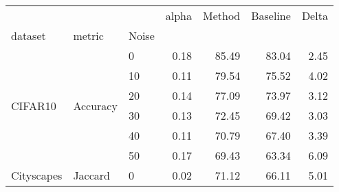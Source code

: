 \begin{tabular}{lllrrrr}
\toprule
 &  &  & alpha & Method & Baseline & Delta \\
dataset & metric & Noise &  &  &  &  \\
\midrule
\multirow[t]{6}{*}{CIFAR10} & \multirow[t]{6}{*}{Accuracy} & 0 & 0.18 & 85.49 & 83.04 & 2.45 \\
 &  & 10 & 0.11 & 79.54 & 75.52 & 4.02 \\
 &  & 20 & 0.14 & 77.09 & 73.97 & 3.12 \\
 &  & 30 & 0.13 & 72.45 & 69.42 & 3.03 \\
 &  & 40 & 0.11 & 70.79 & 67.40 & 3.39 \\
 &  & 50 & 0.17 & 69.43 & 63.34 & 6.09 \\
\cline{1-7} \cline{2-7}
Cityscapes & Jaccard & 0 & 0.02 & 71.12 & 66.11 & 5.01 \\
\cline{1-7} \cline{2-7}
\bottomrule
\end{tabular}
